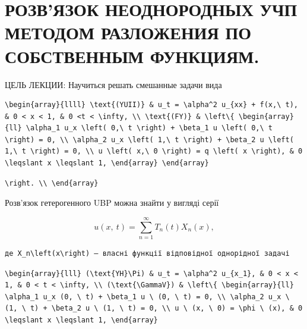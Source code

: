 \documentclass[
  ukrainian,
]{article}
\begin{document}
\section{РОЗВ'ЯЗОК НЕОДНОРОДНЫХ УЧП МЕТОДОМ РАЗЛОЖЕНИЯ ПО СОБСТВЕННЫМ
ФУНКЦИЯМ.}\label{ux440ux43eux437ux432ux44fux437ux43eux43a-ux43dux435ux43eux434ux43dux43eux440ux43eux434ux43dux44bux445-ux443ux447ux43f-ux43cux435ux442ux43eux434ux43eux43c-ux440ux430ux437ux43bux43eux436ux435ux43dux438ux44f-ux43fux43e-ux441ux43eux431ux441ux442ux432ux435ux43dux43dux44bux43c-ux444ux443ux43dux43aux446ux438ux44fux43c.}

ЦЕЛЬ ЛЕКЦИИ: Научиться решать смешанные задачи вида

\begin{verbatim}
\begin{array}{llll} \text{(YUII)} & u_t = \alpha^2 u_{xx} + f(x,\ t), & 0 < x < 1, & 0 <t < \infty, \\ \text{(FY)} & \left\{ \begin{array}{ll} \alpha_1 u_x \left( 0,\ t \right) + \beta_1 u \left( 0,\ t \right) = 0, \\ \alpha_2 u_x \left( 1,\ t \right) + \beta_2 u \left( 1,\ t \right) = 0, \\ u \left( x,\ 0 \right) = q \left( x \right), & 0 \leqslant x \leqslant 1, \end{array} \end{array}
\end{verbatim}

\begin{verbatim}
\right. \\ \end{array}
\end{verbatim}

Розв'язок гетерогенного UBP можна знайти у вигляді серії

\[
u\left( x,\ t\right) =\sum_{n=1}^{\infty}T_{n}\left( t\right) X_{n}\left( x\right) ,
\]

\begin{verbatim}
де X_n\left(x\right) — власні функції відповідної однорідної задачі
\end{verbatim}

\begin{verbatim}
\begin{array}{lll} (\text{YH}\Pi) & u_t = \alpha^2 u_{x_1}, & 0 < x < 1, & 0 < t < \infty, \\ (\text{\GammaV}) & \left\{ \begin{array}{ll} \alpha_1 u_x (0, \ t) + \beta_1 u \ (0, \ t) = 0, \\ \alpha_2 u_x \ (1, \ t) + \beta_2 u \ (1, \ t) = 0, \\ u \ (x, \ 0) = \phi \ (x), & 0 \leqslant x \leqslant 1, \end{array}
\end{verbatim}
\end{document}
